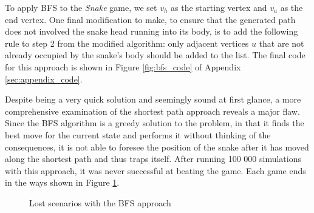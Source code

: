 \documentclass[12pt]{article}
\begin{document}
To apply BFS to the \textit{Snake} game, we set $v_{h}$ as the starting vertex and $v_{a}$ as the end vertex. One final modification to make, to ensure that the generated path does not involved the snake head running into its body, is to add the following rule to step 2 from the modified algorithm: only adjacent vertices $u$ that are not already occupied by the snake's body should be added to the list. The final code for this approach is shown in Figure \ref{fig:bfs_code} of Appendix \ref{sec:appendix_code}.

Despite being a very quick solution and seemingly sound at first glance, a more comprehensive examination of the shortest path approach reveals a major flaw. Since the BFS algorithm is a greedy solution to the problem, in that it finds the best move for the current state and performs it without thinking of the consequences, it is not able to foresee the position of the snake after it has moved along the shortest path and thus traps itself. After running 100 000 simulations with this approach, it was never successful at beating the game. Each game ends in the ways shown in Figure \ref{fig:bfs_issues}.

\begin{figure}[!h]
\centering
	\hspace{1.15em}
	\caption{Lost scenarios with the BFS approach}
	\label{fig:bfs_issues}
\end{figure}
\end{document}
